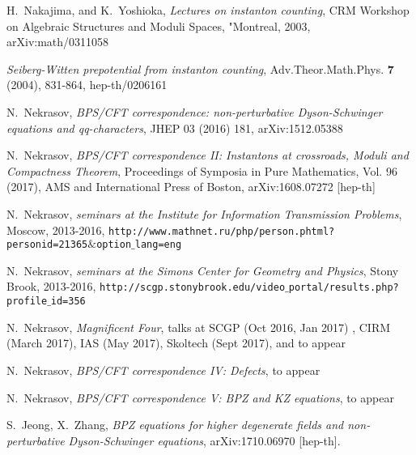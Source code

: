 \documentclass[12pt]{amsart}
\newcommand {\3}{\underline{\bf 3}}
\newcommand {\4}{\underline{\bf 4}}
\newcommand {\6}{\underline{\bf 6}}
\begin{document}
\begin{thebibliography}{KLLSW}
H.~Nakajima, and K.~Yoshioka, \emph{Lectures on instanton counting}, 
CRM Workshop on Algebraic Structures and Moduli Spaces, "Montreal, 2003, arXiv:math/0311058




\emph{Seiberg-Witten prepotential from instanton counting}, Adv.Theor.Math.Phys. {\bf 7} (2004), 831-864, 
hep-th/0206161
	
	
N.~Nekrasov, \emph{BPS/CFT correspondence: non-perturbative Dyson-Schwinger
                        equations and qq-characters},
     JHEP 03 (2016) 181, arXiv:1512.05388
     
N.~Nekrasov, \emph{BPS/CFT correspondence II: Instantons at crossroads,
                        Moduli and Compactness Theorem},
Proceedings of Symposia in Pure Mathematics, Vol. 96 (2017),  
 AMS and International Press of Boston, arXiv:1608.07272 [hep-th]
 
 N.~Nekrasov, \emph{seminars at the Institute for Information Transmission Problems}, Moscow, 2013-2016, {\tt http://www.mathnet.ru/php/person.phtml?personid=21365$\&$option$\_$lang=eng}

 
 N.~Nekrasov, \emph{seminars at the Simons Center for Geometry and Physics},
Stony Brook, 2013-2016,
	{\tt http://scgp.stonybrook.edu/video$\_$portal/results.php?profile$\_$id=356}
	
 
 N.~Nekrasov, \emph{Magnificent Four}, talks at SCGP (Oct 2016, Jan 2017) , CIRM (March 2017), IAS (May 2017), Skoltech (Sept 2017), and to appear
 
N.~Nekrasov, \emph{BPS/CFT correspondence IV: Defects}, to appear

N.~Nekrasov, \emph{BPS/CFT correspondence V: BPZ and KZ equations}, to appear

S.~Jeong, X.~Zhang, 
\emph{BPZ equations for higher degenerate fields and non-perturbative Dyson-Schwinger equations},
  arXiv:1710.06970 [hep-th].
  
  
\end{thebibliography}
\end{document}

